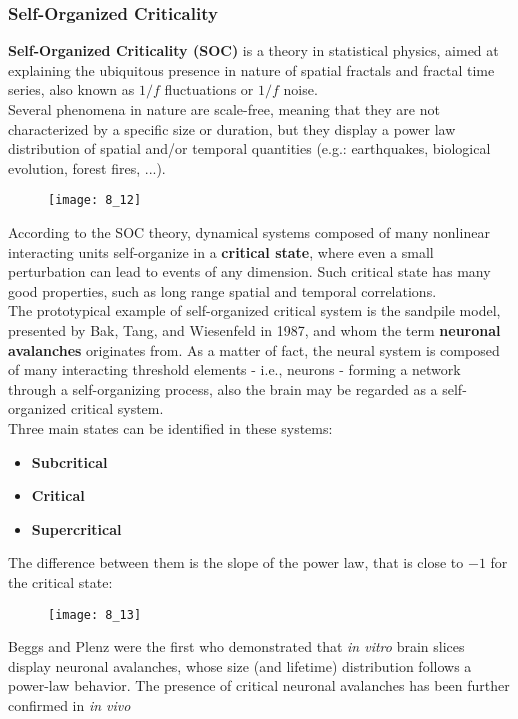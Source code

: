 \subsubsection{Self-Organized Criticality}
\textbf{Self-Organized Criticality (SOC)} is a theory in statistical physics, aimed at
explaining the ubiquitous presence in nature of spatial fractals and fractal time series,
also known as \(1/f\) fluctuations or \(1/f\) noise.\\
Several phenomena in nature are scale-free, meaning that they are not characterized by a
specific size or duration, but they display a power law distribution of spatial and/or
temporal quantities (e.g.: earthquakes, biological evolution, forest fires, ...).
\begin{figure}[H]
    \texttt{[image: 8\_12]}
    \centering
\end{figure}
According to the SOC theory, dynamical systems composed of many nonlinear interacting units
self-organize in a \textbf{critical state}, where even a small perturbation can lead to
events of any dimension. Such critical state has many good properties, such as long range
spatial and temporal correlations.\\
The prototypical example of self-organized critical system is the sandpile model, presented
by Bak, Tang, and Wiesenfeld in 1987, and whom the term \textbf{neuronal avalanches}
originates from. As a matter of fact, the neural system is composed of many interacting
threshold elements - i.e., neurons - forming a network through a self-organizing process,
also the brain may be regarded as a self-organized critical system.\\
Three main states can be identified in these systems:
\begin{itemize}
    \item \textbf{Subcritical}
    \item \textbf{Critical}
    \item \textbf{Supercritical}
\end{itemize}
The difference between them is the slope of the power law, that is close to \(-1\) for the
critical state:
\begin{figure}[H]
    \texttt{[image: 8\_13]}
    \centering
\end{figure}
Beggs and Plenz were the first who demonstrated that \textit{in vitro} brain slices display
neuronal avalanches, whose size (and lifetime) distribution follows a power-law behavior.
The presence of critical neuronal avalanches has been further confirmed in \textit{in vivo}
